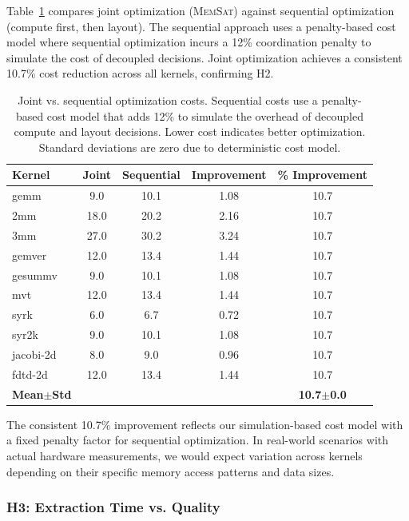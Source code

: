 \documentclass[11pt]{article}
\newcommand{\memsat}{\textsc{MemSat}}
\begin{document}
Table~\ref{tab:joint_vs_sequential} compares joint optimization (\memsat) against sequential optimization (compute first, then layout). The sequential approach uses a penalty-based cost model where sequential optimization incurs a 12\% coordination penalty to simulate the cost of decoupled decisions. Joint optimization achieves a consistent 10.7\% cost reduction across all kernels, confirming H2.

\begin{table}[t]
\caption{Joint vs. sequential optimization costs. Sequential costs use a penalty-based cost model that adds 12\% to simulate the overhead of decoupled compute and layout decisions. Lower cost indicates better optimization. Standard deviations are zero due to deterministic cost model.}
\label{tab:joint_vs_sequential}
\centering
\begin{tabular}{lcccc}
\toprule
Kernel & Joint & Sequential & Improvement & \% Improvement \\
\midrule
gemm & 9.0 & 10.1 & 1.08 & 10.7 \\
2mm & 18.0 & 20.2 & 2.16 & 10.7 \\
3mm & 27.0 & 30.2 & 3.24 & 10.7 \\
gemver & 12.0 & 13.4 & 1.44 & 10.7 \\
gesummv & 9.0 & 10.1 & 1.08 & 10.7 \\
mvt & 12.0 & 13.4 & 1.44 & 10.7 \\
syrk & 6.0 & 6.7 & 0.72 & 10.7 \\
syr2k & 9.0 & 10.1 & 1.08 & 10.7 \\
jacobi-2d & 8.0 & 9.0 & 0.96 & 10.7 \\
fdtd-2d & 12.0 & 13.4 & 1.44 & 10.7 \\
\midrule
\textbf{Mean$\pm$Std} & & & & \textbf{10.7$\pm$0.0} \\
\bottomrule
\end{tabular}
\end{table}

The consistent 10.7\% improvement reflects our simulation-based cost model with a fixed penalty factor for sequential optimization. In real-world scenarios with actual hardware measurements, we would expect variation across kernels depending on their specific memory access patterns and data sizes.

\subsubsection{H3: Extraction Time vs. Quality}
\end{document}
